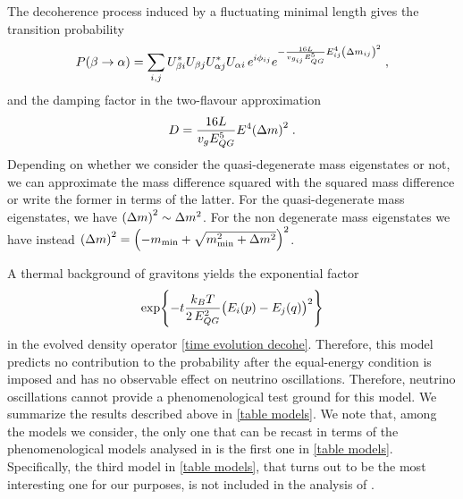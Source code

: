 \documentclass[11pt]{article}
\begin{document}
The decoherence process induced by a fluctuating minimal length \cite{Petruzziello:2020wkd} gives the transition probability
    \begin{equation}
         P(\beta\to\alpha) = \sum_{i,j} U^*_{\beta i} U_{\beta j} U^*_{\alpha j} U_{\alpha i} \,e^{i \phi_{ij}} e^{-\frac{16L}{v_{g_{ij}}E_{QG}^5}E_{ij}^4\qty(\Delta m_{ij})^2}\;,\label{Oscillation probability decoh Petruziello}
    \end{equation}
and the damping factor in the two-flavour approximation 
    \begin{equation}\label{damping factor 2 flavours Petruzziello}
        D=\frac{16L}{v_{g}E_{QG}^5}E^4\qty(\Delta m)^2\;.
    \end{equation}
Depending on whether we consider the quasi-degenerate mass eigenstates or not, we can approximate the mass difference squared with the squared mass difference or write the former in terms of the latter. For the quasi-degenerate mass eigenstates, we have $\qty(\Delta m)^2 \sim \Delta m^2$. For the non degenerate mass eigenstates we have instead $\qty(\Delta m)^2 = \qty(-m_{\text{min}}+\sqrt{m^2_{\text{min}}+\Delta m^2})^2$.
    
A thermal background of gravitons \cite{Blencowe:2012mp} yields the exponential factor 
\begin{equation}
    \exp{-t\frac{k_BT}{2\,E_{QG}^2}\qty(E_i(p)-E_j(q))^2}
\end{equation}
in the evolved density operator \eqref{time evolution decohe}. Therefore, this model predicts no contribution to the probability after the equal-energy condition is imposed and  has no observable effect on neutrino oscillations. Therefore,  neutrino oscillations cannot provide a  phenomenological test ground for this model. We summarize the results described above in \cref{table models}. We note that, among the models we consider, the only one that can be recast in terms of the phenomenological models analysed in \cite{DeRomeri:2023dht} is the first one in \cref{table models}. Specifically, the third model in \cref{table models}, that turns out to be the most interesting one for our purposes, is not included in the analysis of \cite{DeRomeri:2023dht}.
\end{document}
